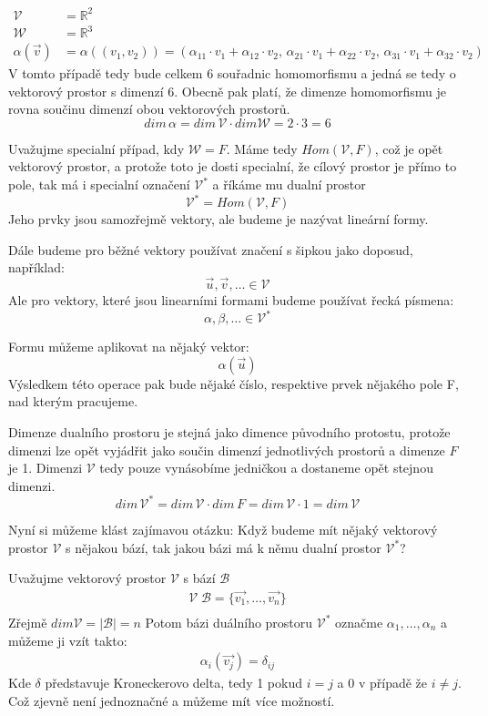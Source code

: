\begin{example}[Homomorfismus]
    \begin{align*}
        \mathcal{V} &= \mathbb{R}^2\\
        \mathcal{W} &= \mathbb{R}^3\\
        \alpha(\vec{v}) &= \alpha((v_1, v_2)) =
        (\alpha_{11} \cdot v_1 + \alpha_{12} \cdot v_2,\,
        \alpha_{21} \cdot v_1 + \alpha_{22} \cdot v_2,\,
        \alpha_{31} \cdot v_1 + \alpha_{32} \cdot v_2)
    \end{align*}
    V tomto případě tedy bude celkem 6 souřadnic homomorfismu a jedná se tedy
    o vektorový prostor s dimenzí 6. Obecně pak platí,
    že dimenze homomorfismu je rovna součinu dimenzí obou vektorových prostorů.
    $$dim\,\alpha = dim\,\mathcal{V} \cdot dim \mathcal{W} = 2 \cdot 3 = 6$$
\end{example}

Uvažujme specialní případ, kdy $\mathcal{W} = F$.
Máme tedy $Hom(\mathcal{V}, F)$, což je opět vektorový prostor, a protože
toto je dosti specialní, že cílový prostor je přímo to pole, tak má i specialní
označení $\mathcal{V}^*$ a říkáme mu dualní prostor
$$\mathcal{V}^* = Hom(\mathcal{V}, F)$$
Jeho prvky jsou samozřejmě vektory, ale budeme je nazývat lineární formy.

Dále budeme pro běžné vektory používat značení s šipkou jako doposud, například:
$$\vec{u}, \vec{v},\ldots \in \mathcal{V}$$
Ale pro vektory, které jsou linearními formami budeme používat řecká písmena:
$$\alpha, \beta, \ldots \in \mathcal{V}^*$$

Formu můžeme aplikovat na nějaký vektor:
$$\alpha(\vec{u})$$
Výsledkem této operace pak bude nějaké číslo, respektive prvek nějakého pole F,
nad kterým pracujeme.

Dimenze dualního prostoru je stejná jako dimence původního protostu, protože
dimenzi lze opět vyjádřit jako součin dimenzí jednotlivých prostorů a dimenze $F$
je 1. Dimenzi $\mathcal{V}$ tedy pouze vynásobíme jedničkou a dostaneme opět stejnou dimenzi.
$$dim\,\mathcal{V}^* = dim\, \mathcal{V} \cdot dim\,F = dim\,\mathcal{V} \cdot 1 = dim\,\mathcal{V}$$

Nyní si můžeme klást zajímavou otázku: Když budeme mít nějaký vektorový prostor $\mathcal{V}$
s nějakou bází, tak jakou bázi má k němu dualní prostor $\mathcal{V}^*$?

Uvažujme vektorový prostor $\mathcal{V}$ s bází $\mathcal{B}$
\begin{align*}
    \mathcal{V}\;\mathcal{B} = \{\vec{v_1}, \ldots, \vec{v_n}\}\\
\end{align*}
Zřejmě $dim \mathcal{V} = |\mathcal{B}| = n$
Potom bázi duálního prostoru $\mathcal{V}^*$ označme $\alpha_1, \ldots, \alpha_n$
a můžeme ji vzít takto:
\begin{align*}
    \alpha_i(\vec{v_j}) = \delta_{ij}
\end{align*}
Kde $\delta$ představuje Kroneckerovo delta, tedy 1 pokud $i=j$ a 0 v případě že $i \neq j$.
Což zjevně není jednoznačné a můžeme mít více možností.

